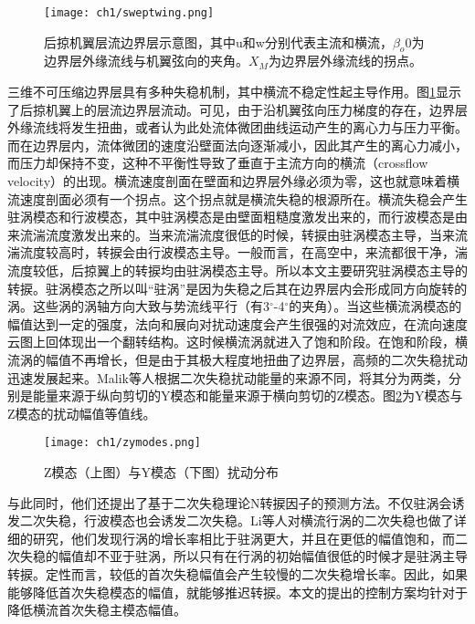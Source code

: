 \begin{figure}
  \centering
  \texttt{[image: ch1/sweptwing.png]}
  \caption{后掠机翼层流边界层示意图\cite{Aranl2000}，其中u和w分别代表主流和横流，$\beta_o0$为边界层外缘流线与机翼弦向的夹角。$X_M$为边界层外缘流线的拐点。}\label{f:sweptwing}
\end{figure}


三维不可压缩边界层具有多种失稳机制\cite{Saric2003}，其中横流不稳定性起主导作用。图\ref{f:sweptwing}显示了后掠机翼上的层流边界层流动。可见，由于沿机翼弦向压力梯度的存在，边界层外缘流线将发生扭曲，或者认为此处流体微团曲线运动产生的离心力与压力平衡。而在边界层内，流体微团的速度沿壁面法向逐渐减小，因此其产生的离心力减小，而压力却保持不变，这种不平衡性导致了垂直于主流方向的横流（crossflow velocity）的出现。横流速度剖面在壁面和边界层外缘必须为零，这也就意味着横流速度剖面必须有一个拐点。这个拐点就是横流失稳的根源所在。横流失稳会产生驻涡模态和行波模态，其中驻涡模态是由壁面粗糙度激发出来的，而行波模态是由来流湍流度激发出来的\cite{Schrader2008}。当来流湍流度很低的时候，转捩由驻涡模态主导，当来流湍流度较高时，转捩会由行波模态主导\cite{Bipps1999}。一般而言，在高空中，来流都很干净，湍流度较低，后掠翼上的转捩均由驻涡模态主导。所以本文主要研究驻涡模态主导的转捩。驻涡模态之所以叫“驻涡”是因为失稳之后其在边界层内会形成同方向旋转的涡。这些涡的涡轴方向大致与势流线平行（有3$^\circ$-4$^\circ$的夹角）。当这些横流涡模态的幅值达到一定的强度，法向和展向对扰动速度会产生很强的对流效应，在流向速度云图上回体现出一个翻转结构。这时候横流涡就进入了饱和阶段\cite{Malik1994,Haynes2000}。在饱和阶段，横流涡的幅值不再增长，但是由于其极大程度地扭曲了边界层，高频的二次失稳扰动迅速发展起来\cite{White2005}。Malik等人\cite{Malik1999}根据二次失稳扰动能量的来源不同，将其分为两类，分别是能量来源于纵向剪切的Y模态和能量来源于横向剪切的Z模态。图\ref{f:yzmodes}为Y模态与Z模态的扰动幅值等值线。
\begin{figure}
  \centering
  \texttt{[image: ch1/zymodes.png]}
  \caption{Z模态（上图）与Y模态（下图）扰动分布\cite{Malik1999}}\label{f:yzmodes}
\end{figure}
与此同时，他们还提出了基于二次失稳理论N转捩因子的预测方法。不仅驻涡会诱发二次失稳，行波模态也会诱发二次失稳。Li\cite{Li2014}等人对横流行涡的二次失稳也做了详细的研究，他们发现行涡的增长率相比于驻涡更大，并且在更低的幅值饱和，而二次失稳的幅值却不亚于驻涡，所以只有在行涡的初始幅值很低的时候才是驻涡主导转捩。定性而言，较低的首次失稳幅值会产生较慢的二次失稳增长率\cite{Li2015a}。因此，如果能够降低首次失稳模态的幅值，就能够推迟转捩。本文的提出的控制方案均针对于降低横流首次失稳主模态幅值。

